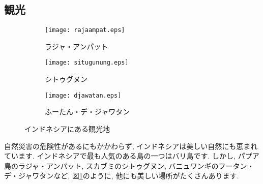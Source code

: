 \documentclass[a4j, twocolumn]{jarticle}
\begin{document}
  \subsection{観光}
  \begin{figure}[h]
    \centering
    \begin{subfigure}[b]{0.3\textwidth}
      \texttt{[image: rajaampat.eps]}
      \caption{ラジャ・アンパット}
    \end{subfigure}
    \hfill
    \begin{subfigure}[b]{0.3\textwidth}
      \texttt{[image: situgunung.eps]}
      \caption{シトゥグヌン}
    \end{subfigure}
    \hfill
    \begin{subfigure}[b]{0.3\textwidth}
      \texttt{[image: djawatan.eps]}
      \caption{ふーたん・デ・ジャワタン}
    \end{subfigure}
    \caption{インドネシアにある観光地}\label{tourism}
  \end{figure}
  自然災害の危険性があるにもかかわらず, インドネシアは美しい自然にも恵まれています. インドネシアで最も人気のある島の一つはバリ島です. しかし, パプア島のラジャ・アンパット, スカブミのシトゥグヌン, バニュワンギのフータン・デ・ジャワタンなど, 図\ref{tourism}のように, 他にも美しい場所がたくさんあります\cite{klook2023pemandangan}.
  

  
  
\end{document}
